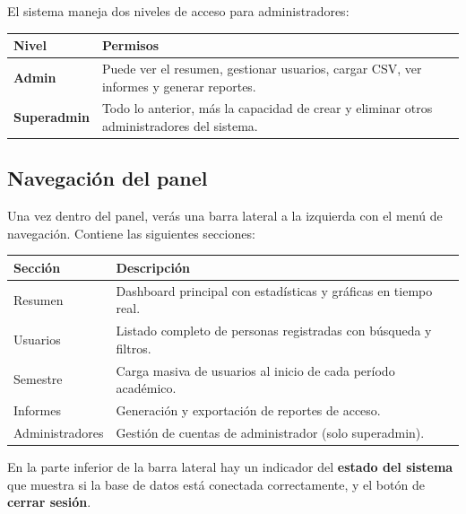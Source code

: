 \documentclass[12pt, a4paper]{article}
\begin{document}
El sistema maneja dos niveles de acceso para administradores:

\begin{center}
\renewcommand{\arraystretch}{1.4}
\begin{tabular}{@{} p{3cm} p{9.5cm} @{}}
  \toprule
  \textbf{Nivel} & \textbf{Permisos} \\
  \midrule
  \textbf{Admin} &
    Puede ver el resumen, gestionar usuarios, cargar CSV,
    ver informes y generar reportes. \\[0.3em]
  \textbf{Superadmin} &
    Todo lo anterior, más la capacidad de crear y eliminar
    otros administradores del sistema. \\
  \bottomrule
\end{tabular}
\end{center}

\subsection{Navegación del panel}

Una vez dentro del panel, verás una barra lateral a la izquierda con
el menú de navegación. Contiene las siguientes secciones:

\begin{center}
\renewcommand{\arraystretch}{1.4}
\begin{tabular}{@{} p{3.5cm} p{9cm} @{}}
  \toprule
  \textbf{Sección} & \textbf{Descripción} \\
  \midrule
  Resumen         & Dashboard principal con estadísticas y gráficas en tiempo real. \\
  Usuarios        & Listado completo de personas registradas con búsqueda y filtros. \\
  Semestre        & Carga masiva de usuarios al inicio de cada período académico. \\
  Informes        & Generación y exportación de reportes de acceso. \\
  Administradores & Gestión de cuentas de administrador (solo superadmin). \\
  \bottomrule
\end{tabular}
\end{center}

En la parte inferior de la barra lateral hay un indicador del
\textbf{estado del sistema} que muestra si la base de datos está
conectada correctamente, y el botón de \textbf{cerrar sesión}.

\end{document}
